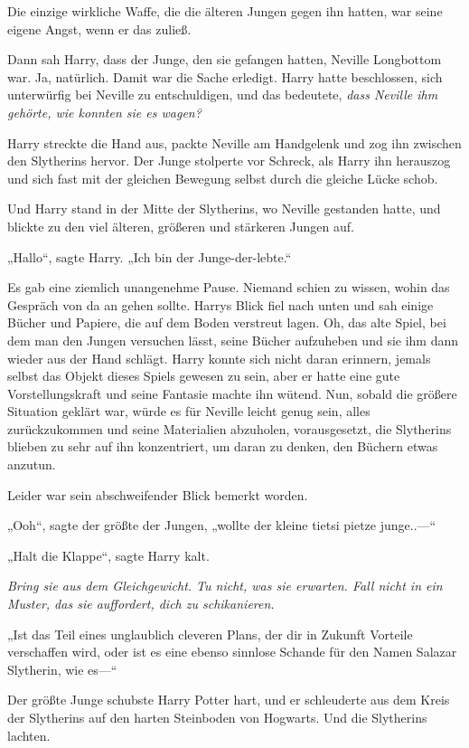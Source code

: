 {Die einzige wirkliche Waffe, die die älteren Jungen gegen ihn hatten, war seine eigene Angst, wenn er das zuließ.

Dann sah Harry, dass der Junge, den sie gefangen hatten, Neville Longbottom war. Ja, natürlich. Damit war die Sache erledigt. Harry hatte beschlossen, sich unterwürfig bei Neville zu entschuldigen, und das bedeutete, \emph{dass Neville ihm gehörte, wie konnten sie es wagen?}

Harry streckte die Hand aus, packte Neville am Handgelenk und zog ihn zwischen den Slytherins hervor. Der Junge stolperte vor Schreck, als Harry ihn herauszog und sich fast mit der gleichen Bewegung selbst durch die gleiche Lücke schob.

Und Harry stand in der Mitte der Slytherins, wo Neville gestanden hatte, und blickte zu den viel älteren, größeren und stärkeren Jungen auf.

„Hallo“, sagte Harry. „Ich bin der Junge-der-lebte.“

Es gab eine ziemlich unangenehme Pause. Niemand schien zu wissen, wohin das Gespräch von da an gehen sollte. Harrys Blick fiel nach unten und sah einige Bücher und Papiere, die auf dem Boden verstreut lagen. Oh, das alte Spiel, bei dem man den Jungen versuchen lässt, seine Bücher aufzuheben und sie ihm dann wieder aus der Hand schlägt. Harry konnte sich nicht daran erinnern, jemals selbst das Objekt dieses Spiels gewesen zu sein, aber er hatte eine gute Vorstellungskraft und seine Fantasie machte ihn wütend. Nun, sobald die größere Situation geklärt war, würde es für Neville leicht genug sein, alles zurückzukommen und seine Materialien abzuholen, vorausgesetzt, die Slytherins blieben zu sehr auf ihn konzentriert, um daran zu denken, den Büchern etwas anzutun.

Leider war sein abschweifender Blick bemerkt worden.

„Ooh“, sagte der größte der Jungen, „wollte der kleine tietsi pietze junge..—“

„Halt die Klappe“, sagte Harry kalt.

\emph{Bring sie aus dem Gleichgewicht. Tu nicht, was sie erwarten. Fall nicht in ein Muster, das sie auffordert, dich zu schikanieren.}

„Ist das Teil eines unglaublich cleveren Plans, der dir in Zukunft Vorteile verschaffen wird, oder ist es eine ebenso sinnlose Schande für den Namen Salazar Slytherin, wie es—“

Der größte Junge schubste Harry Potter hart, und er schleuderte aus dem Kreis der Slytherins auf den harten Steinboden von Hogwarts. Und die Slytherins lachten.

}
